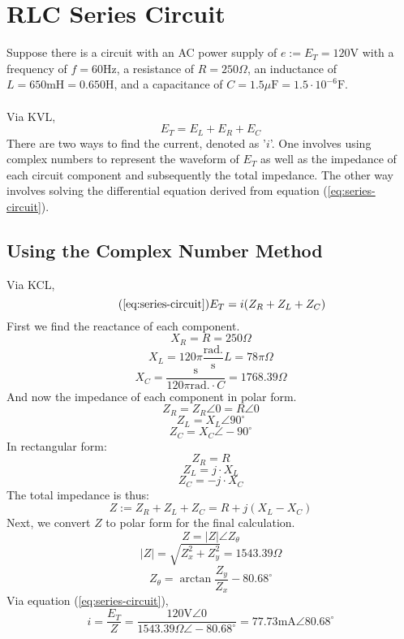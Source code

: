 \documentclass{article}
\begin{document}
	\section[Series]{RLC Series Circuit}
	Suppose there is a circuit with an AC power supply of $e:=E_T=120$V with a 
	frequency of $f=60$Hz, a resistance of $R=250\Omega$, an inductance of 
	$L=650\text{mH}=0.650\text{H}$, and a capacitance of 
	$C=1.5\mu\text{F}=1.5\cdot10^{-6}\text{F}$. \\ \\
	Via KVL,
	\begin{equation}\label{eq:series-circuit}
		E_T=E_L + E_R + E_C
	\end{equation}
	There are two ways to find the current, denoted as '$i$'.  One involves 
	using complex numbers to represent the waveform of $E_T$ as well as the 
	impedance of each circuit component and subsequently the total impedance.  
	The other way involves solving the differential equation derived from 
	equation (\ref{eq:series-circuit}).
	\subsection[ComplexNum]{Using the Complex Number Method}
	Via KCL,
	\begin{equation}\tag{\ref{eq:series-circuit}}
		E_T = i(Z_R + Z_L + Z_C)
	\end{equation}
	First we find the reactance of each component.
	$$ X_R = R = 250\Omega$$
	$$ X_L = 120\pi \frac{\text{rad.}}{\text{s}} L = 78\pi\Omega$$
	$$ X_C = \frac{\text{s}}{120\pi\text{rad.} \cdot C} = 1768.39\Omega$$
	And now the impedance of each component in polar form.
	$$ Z_R = Z_R\angle0 = R\angle0$$
	$$ Z_L = X_L\angle90^{\circ}$$
	$$ Z_C = X_C\angle-90^{\circ}$$
	In rectangular form:
	$$ Z_R = R$$
	$$ Z_L = j \cdot X_L$$
	$$ Z_C = - j\cdot X_C$$
	The total impedance is thus:
	$$ Z:=Z_R+Z_L+Z_C = R + j(X_L-X_C)$$
	Next, we convert $Z$ to polar form for the final calculation.
	$$ Z=|Z|\angle Z_\theta$$
	$$|Z|=\sqrt{Z_x^2 + Z_y^2} = 1543.39\Omega$$
	$$ Z_\theta = \arctan \frac{Z_y}{Z_x}-80.68^{\circ}$$
	Via equation (\ref{eq:series-circuit}),
	$$ i = \frac{E_T}{Z} = 
	\frac{120\text{V}\angle0}{1543.39\Omega\angle-80.68^{\circ}} = 
	77.73\text{mA}\angle80.68^{\circ}$$
\end{document}
